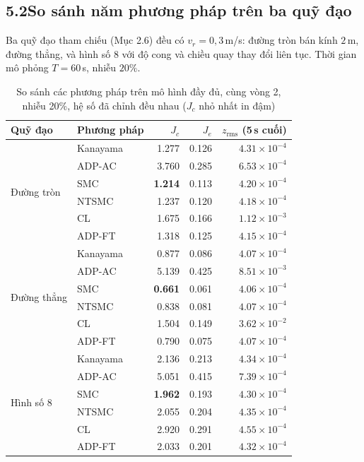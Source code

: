 \documentclass[12pt,a4paper]{article}
\makeatletter
\newcommand{\seclabel}[2]{\phantomsection\protected@edef\@currentlabel{#2}\label{#1}}
\makeatother
\begin{document}
\subsection*{5.2\quad So sánh năm phương pháp trên ba quỹ đạo}
\seclabel{sec:partA}{5.2}

Ba quỹ đạo tham chiếu (Mục 2.6) đều có $v_r = 0{,}3$\,m/s: đường tròn bán kính $2$\,m, đường thẳng, và hình số 8 với độ cong và chiều quay thay đổi liên tục. Thời gian mô phỏng $T = 60$\,s, nhiễu $20\%$.

\begin{table}[H]
\centering
\caption{So sánh các phương pháp trên mô hình đầy đủ, cùng vòng 2, nhiễu 20\%, hệ số đã chỉnh đều nhau ($J_c$ nhỏ nhất in đậm)}
\label{tab:partA}
\begin{tabular}{llrrr}
\toprule
\textbf{Quỹ đạo} & \textbf{Phương pháp} & $J_c$ & $J_e$ & $z_\text{rms}$ (5\,s cuối) \\
\midrule
\multirow{6}{*}{Đường tròn} & Kanayama & 1.277 & 0.126 & $4.31\times10^{-4}$ \\
 & ADP-AC & 3.760 & 0.285 & $6.53\times10^{-4}$ \\
 & SMC & \textbf{1.214} & 0.113 & $4.20\times10^{-4}$ \\
 & NTSMC & 1.237 & 0.120 & $4.18\times10^{-4}$ \\
 & CL & 1.675 & 0.166 & $1.12\times10^{-3}$ \\
 & ADP-FT & 1.318 & 0.125 & $4.15\times10^{-4}$ \\
\midrule
\multirow{6}{*}{Đường thẳng} & Kanayama & 0.877 & 0.086 & $4.07\times10^{-4}$ \\
 & ADP-AC & 5.139 & 0.425 & $8.51\times10^{-3}$ \\
 & SMC & \textbf{0.661} & 0.061 & $4.06\times10^{-4}$ \\
 & NTSMC & 0.838 & 0.081 & $4.07\times10^{-4}$ \\
 & CL & 1.504 & 0.149 & $3.62\times10^{-2}$ \\
 & ADP-FT & 0.790 & 0.075 & $4.07\times10^{-4}$ \\
\midrule
\multirow{6}{*}{Hình số 8} & Kanayama & 2.136 & 0.213 & $4.34\times10^{-4}$ \\
 & ADP-AC & 5.051 & 0.415 & $7.39\times10^{-4}$ \\
 & SMC & \textbf{1.962} & 0.193 & $4.30\times10^{-4}$ \\
 & NTSMC & 2.055 & 0.204 & $4.35\times10^{-4}$ \\
 & CL & 2.920 & 0.291 & $4.55\times10^{-4}$ \\
 & ADP-FT & 2.033 & 0.201 & $4.32\times10^{-4}$ \\
\bottomrule
\end{tabular}
\end{table}
\end{document}

